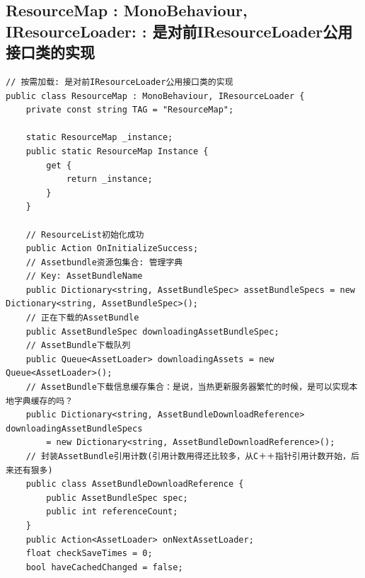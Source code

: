 \documentclass[9pt, b5paper]{article}
\begin{document}
\subsection{ResourceMap : MonoBehaviour, IResourceLoader: : 是对前IResourceLoader公用接口类的实现}
\label{sec-7-5}
\begin{verbatim}
// 按需加载: 是对前IResourceLoader公用接口类的实现
public class ResourceMap : MonoBehaviour, IResourceLoader {
    private const string TAG = "ResourceMap";
        
    static ResourceMap _instance;
    public static ResourceMap Instance {
        get {
            return _instance;
        }
    }

    // ResourceList初始化成功
    public Action OnInitializeSuccess;
    // Assetbundle资源包集合: 管理字典
    // Key: AssetBundleName
    public Dictionary<string, AssetBundleSpec> assetBundleSpecs = new Dictionary<string, AssetBundleSpec>();
    // 正在下载的AssetBundle
    public AssetBundleSpec downloadingAssetBundleSpec;
    // AssetBundle下载队列
    public Queue<AssetLoader> downloadingAssets = new Queue<AssetLoader>();
    // AssetBundle下载信息缓存集合：是说，当热更新服务器繁忙的时候，是可以实现本地字典缓存的吗？
    public Dictionary<string, AssetBundleDownloadReference> downloadingAssetBundleSpecs
        = new Dictionary<string, AssetBundleDownloadReference>();
    // 封装AssetBundle引用计数(引用计数用得还比较多，从C＋＋指针引用计数开始，后来还有狠多)
    public class AssetBundleDownloadReference {
        public AssetBundleSpec spec;
        public int referenceCount;
    }
    public Action<AssetLoader> onNextAssetLoader;
    float checkSaveTimes = 0;
    bool haveCachedChanged = false;


\end{verbatim}
\end{document}
